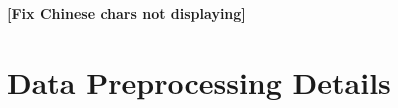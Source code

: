 \documentclass[runningheads]{llncs}
\newcommand{\matt}[1]{{\bf\color{green!50!black}[#1]}} %
\begin{document}
\newpage
%
%




\matt{Fix Chinese chars not displaying}


\appendix
\section{Data Preprocessing Details}
\label{sec:preprocessing-appendix}
\end{document}

